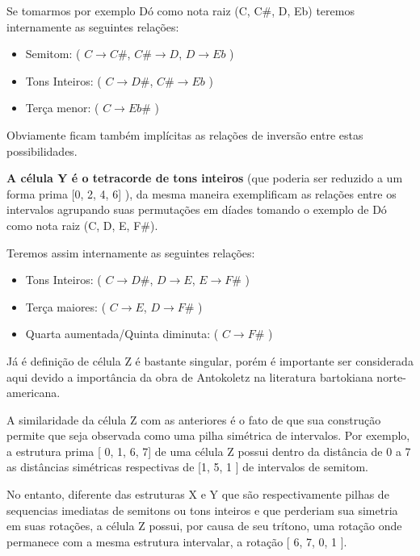 \documentclass[
	12pt,				%
	openright,			%
	twoside,			%
	a4paper,			%
	english,			%
	french,				%
	spanish,			%
	brazil				%
	]{abntex2}
\begin{document}
Se tomarmos por exemplo Dó como nota raiz (C, C\#, D, Eb) teremos internamente as seguintes relações:


\begin{itemize}
\item Semitom: ( $C \rightarrow C\#$, $C\# \rightarrow D$, $D \rightarrow Eb$ ) 

\item Tons Inteiros: ( $C \rightarrow D\#$, $C\# \rightarrow Eb$ )

\item Terça menor: ( $C \rightarrow Eb\#$ )
\end{itemize}

Obviamente ficam também implícitas as relações de inversão entre estas possibilidades.

\textbf{A célula Y é o tetracorde de tons inteiros} (que poderia ser reduzido a um forma prima [0, 2, 4, 6] ), da mesma maneira  exemplificam as relações entre os intervalos agrupando suas permutações em díades tomando o exemplo de Dó como nota raiz (C, D, E, F\#). 

Teremos assim internamente as seguintes relações:

\begin{itemize}
\item Tons Inteiros: ( $C \rightarrow D\#$, $D \rightarrow E$, $E \rightarrow F\#$ ) 

\item Terça maiores: ( $C \rightarrow E$, $D \rightarrow F\#$ )

\item Quarta aumentada/Quinta diminuta: ( $C \rightarrow F\#$ )
\end{itemize}


Já é definição de célula Z é bastante singular, porém é importante ser considerada aqui devido a importância da obra de Antokoletz na literatura bartokiana norte-americana. 

A similaridade da célula Z com as anteriores é o fato de que sua construção permite que seja observada como uma pilha simétrica de intervalos. Por exemplo, a estrutura prima [ 0, 1, 6, 7] de uma célula Z possui dentro da distância de 0 a 7 as distâncias simétricas respectivas de [1, 5, 1 ] de intervalos de semitom. 

No entanto, diferente das estruturas X e Y que são respectivamente pilhas de sequencias imediatas de semitons ou tons inteiros e que perderiam sua simetria em suas rotações, a célula Z possui, por causa de seu trítono, uma rotação onde permanece com a mesma estrutura intervalar, a rotação [ 6, 7, 0, 1 ]. 
\end{document}

